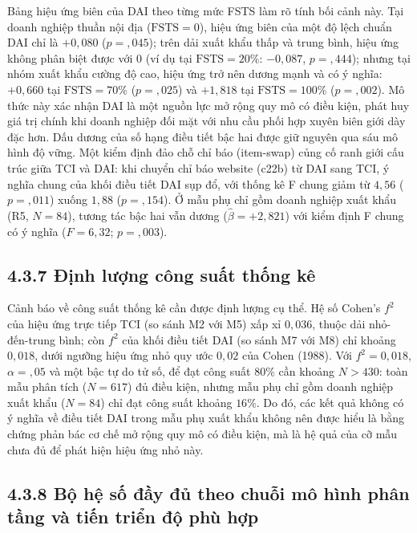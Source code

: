 \documentclass[
  a4paper,
  13pt]{extreport}
\begin{document}
Bảng hiệu ứng biên của DAI theo từng mức FSTS làm rõ tính bối cảnh này.
Tại doanh nghiệp thuần nội địa (\(\text{FSTS} = 0\)), hiệu ứng biên của
một độ lệch chuẩn DAI chỉ là \(+0{,}080\) (\(p = {,}045\)); trên dải
xuất khẩu thấp và trung bình, hiệu ứng không phân biệt được với 0 (ví dụ
tại \(\text{FSTS} = 20\%\): \(-0{,}087\), \(p = {,}444\)); nhưng tại
nhóm xuất khẩu cường độ cao, hiệu ứng trở nên dương mạnh và có ý nghĩa:
\(+0{,}660\) tại \(\text{FSTS} = 70\%\) (\(p = {,}025\)) và \(+1{,}818\)
tại \(\text{FSTS} = 100\%\) (\(p = {,}002\)). Mô thức này xác nhận DAI
là một nguồn lực mở rộng quy mô có điều kiện, phát huy giá trị chính khi
doanh nghiệp đối mặt với nhu cầu phối hợp xuyên biên giới dày đặc hơn.
Dấu dương của số hạng điều tiết bậc hai được giữ nguyên qua sáu mô hình
độ vững. Một kiểm định đảo chỗ chỉ báo (item-swap) củng cố ranh giới cấu
trúc giữa TCI và DAI: khi chuyển chỉ báo website (c22b) từ DAI sang TCI,
ý nghĩa chung của khối điều tiết DAI sụp đổ, với thống kê F chung giảm
từ \(4{,}56\) (\(p = {,}011\)) xuống \(1{,}88\) (\(p = {,}154\)). Ở mẫu
phụ chỉ gồm doanh nghiệp xuất khẩu (R5, \(N = 84\)), tương tác bậc hai
vẫn dương (\(\hat{\beta} = +2{,}821\)) với kiểm định F chung có ý nghĩa
(\(F = 6{,}32\); \(p = {,}003\)).

\hypertarget{ux111ux1ecbnh-lux1b0ux1ee3ng-cuxf4ng-suux1ea5t-thux1ed1ng-kuxea}{%
\subsection{4.3.7 Định lượng công suất thống
kê}\label{ux111ux1ecbnh-lux1b0ux1ee3ng-cuxf4ng-suux1ea5t-thux1ed1ng-kuxea}}

Cảnh báo về công suất thống kê cần được định lượng cụ thể. Hệ số Cohen's
\(f^2\) của hiệu ứng trực tiếp TCI (so sánh M2 với M5) xấp xỉ
\(0{,}036\), thuộc dải nhỏ-đến-trung bình; còn \(f^2\) của khối điều
tiết DAI (so sánh M7 với M8) chỉ khoảng \(0{,}018\), dưới ngưỡng hiệu
ứng nhỏ quy ước \(0{,}02\) của Cohen (1988). Với \(f^2 = 0{,}018\),
\(\alpha = {,}05\) và một bậc tự do tử số, để đạt công suất \(80\%\) cần
khoảng \(N > 430\): toàn mẫu phân tích (\(N = 617\)) đủ điều kiện, nhưng
mẫu phụ chỉ gồm doanh nghiệp xuất khẩu (\(N = 84\)) chỉ đạt công suất
khoảng \(16\%\). Do đó, các kết quả không có ý nghĩa về điều tiết DAI
trong mẫu phụ xuất khẩu không nên được hiểu là bằng chứng phản bác cơ
chế mở rộng quy mô có điều kiện, mà là hệ quả của cỡ mẫu chưa đủ để phát
hiện hiệu ứng nhỏ này.

\hypertarget{bux1ed9-hux1ec7-sux1ed1-ux111ux1ea7y-ux111ux1ee7-theo-chuux1ed7i-muxf4-huxecnh-phuxe2n-tux1ea7ng-vuxe0-tiux1ebfn-triux1ec3n-ux111ux1ed9-phuxf9-hux1ee3p}{%
\subsection{4.3.8 Bộ hệ số đầy đủ theo chuỗi mô hình phân tầng và tiến
triển độ phù
hợp}\label{bux1ed9-hux1ec7-sux1ed1-ux111ux1ea7y-ux111ux1ee7-theo-chuux1ed7i-muxf4-huxecnh-phuxe2n-tux1ea7ng-vuxe0-tiux1ebfn-triux1ec3n-ux111ux1ed9-phuxf9-hux1ee3p}}
\end{document}
